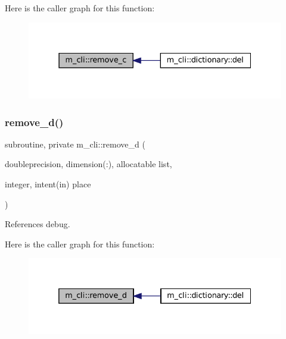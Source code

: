 Here is the caller graph for this function\+:
\nopagebreak
\begin{figure}[H]
\begin{center}
\leavevmode
\includegraphics[width=331pt]{namespacem__cli_a05f549b10f50798d68003b8fd2a2d86a_icgraph}
\end{center}
\end{figure}
\mbox{\label{namespacem__cli_abf22cbc2af66482f33b7bb1a210d9d99}} 
\subsubsection{\texorpdfstring{remove\+\_\+d()}{remove\_d()}}
{\footnotesize\ttfamily subroutine, private m\+\_\+cli\+::remove\+\_\+d (\begin{DoxyParamCaption}\item[{doubleprecision, dimension(\+:), allocatable}]{list,  }\item[{integer, intent(in)}]{place }\end{DoxyParamCaption})\hspace{0.3cm}{\ttfamily [private]}}



References debug.

Here is the caller graph for this function\+:
\nopagebreak
\begin{figure}[H]
\begin{center}
\leavevmode
\includegraphics[width=332pt]{namespacem__cli_abf22cbc2af66482f33b7bb1a210d9d99_icgraph}
\end{center}
\end{figure}
\mbox{\label{namespacem__cli_afa08d3d87184a6dd68a124231e536c93}} 
